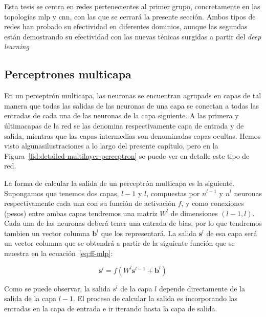 Esta tesis se centra en redes pertenecientes al primer grupo, concretamente en las topologías \gls{mlp} y \gls{cnn}, con las que se cerrará la presente sección. Ambos tipos de redes han probado su efectividad en diferentes dominios, aunque las segundas están demostrando su efectividad con las nuevas ténicas surgidas a partir del \textit{deep learning}

\subsection{Perceptrones multicapa}

En un perceptrón multicapa, las neuronas se encuentran agrupads en capas de tal manera que todas las salidas de las neuronas de una capa se conectan a todas las entradas de cada una de las neuronas de la capa siguiente. A las primera y últimacapas de la red se las denomina respectivamente capa de entrada y de salida, mientras que las capas intermedias son denominadas capas ocultas. Hemos visto algunasilustraciones a lo largo del presente capítulo, pero en la Figura~\ref{fid:detailed-multilayer-perceptron} se puede ver en detalle este tipo de red.

La forma de calcular la salida de un perceptrón multicapa es la siguiente. Supongamos que tenemos dos capas, $l-1$ y $l$, compuestas por $n^{l-1}$ y $n^l$ neuronas respectivamente cada una con su función de activación $f$, y como conexiones (pesos) entre ambas capas tendremos una matriz $W^l$ de dimensiones $(l-1, l)$. Cada una de las neuronas deberá tener una entrada de bias, por lo que tendremos tambien un vector columna $\mathbf{b}^l$ que los representará. La salida $\mathbf{s}^l$ de esa capa será un vector columna que se obtendrá a partir de la siguiente función que se muestra en la ecuación~\ref{eq:ff-mlp}:

\begin{equation}
	\mathbf{s}^l = f(W^l \mathbf{s}^{l-1} + \mathbf{b}^l)
	\label{eq:ff-mlp}
\end{equation}

Como se puede observar, la salida $s^l$ de la capa $l$ depende directamente de la salida de la capa $l - 1$. El proceso de calcular la salida es incorporando las entradas en la capa de entrada e ir iterando hasta la capa de salida.

